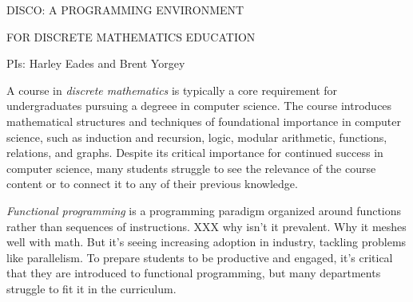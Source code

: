 \centerline{\Large DISCO: A PROGRAMMING ENVIRONMENT}
\vspace{1ex}
\centerline{\Large FOR DISCRETE MATHEMATICS EDUCATION}
\vspace{3ex}
\centerline{\large PIs: Harley Eades and Brent Yorgey}
\vspace{3ex}

\begin{comment}
  The proposal must contain a summary of the proposed activity suitable
  for publication, not more than one page in length. It should not be an
  abstract of the proposal, but rather a self-contained description of the
  activity that would result if the proposal were funded. The summary
  should be written in the third person and include a statement of
  objectives and methods to be employed. It must clearly address in
  separate statements (within the one-page summary): (1) the intellectual
  merit of the proposed activity; and (2) the broader impacts resulting
  from the proposed activity. (See Chapter III for further descriptive
  information on the NSF merit review criteria.) It should be informative
  to other persons working in the same or related fields and, insofar as
  possible, understandable to a scientifically or technically literate lay
  reader. Proposals that do not separately address both merit review
  criteria within the one page Project Summary will be returned without
  review.
\end{comment}

A course in \emph{discrete mathematics} is typically a core
requirement for undergraduates pursuing a degreee in computer
science. The course introduces mathematical structures and techniques
of foundational importance in computer science, such as induction and
recursion, logic, modular arithmetic, functions, relations, and
graphs. Despite its critical importance for continued success in
computer science, many students struggle to see the relevance of the
course content or to connect it to any of their previous knowledge.

\emph{Functional programming} is a programming paradigm organized
around functions rather than sequences of instructions.  XXX why isn't
it prevalent.  Why it meshes well with math.  But it's seeing
increasing adoption in industry, tackling problems like parallelism.
To prepare students to be productive and engaged, it's critical that
they are introduced to functional programming, but many departments
struggle to fit it in the curriculum.

